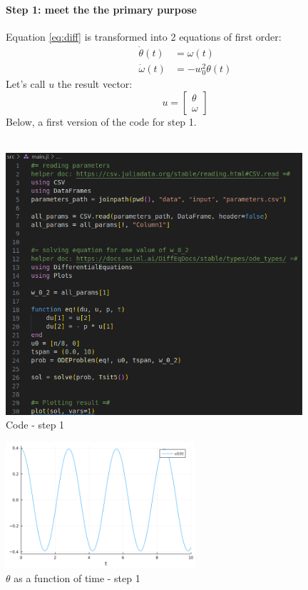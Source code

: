\documentclass[11pt]{article}
\begin{document}
				\paragraph{Step 1: meet the the primary purpose}
					Equation \ref{eq:diff} is transformed into 2 equations of first order:
					\begin{align*}
							\dot{\theta}(t) &= \omega(t) \\
							\dot{\omega}(t) &= - w_0^2 \theta(t)
					\end{align*}
					Let's call $u$ the result vector:
					\begin{equation*}
							u =
							\begin{bmatrix}
								\theta \\
								\omega
							\end{bmatrix}
					\end{equation*}
					Below, a first version of the code for step 1. \\
					\vspace{0.5cm}
					\mbox{} \\
					\begin{minipage}{0.65\textwidth}
							\centering
							\includegraphics[width=11cm]{figures/diff_equation/code_step_1.png}
							\\
							Code - step 1
					\end{minipage}
					\begin{minipage}{0.35\textwidth}
							\centering
							\includegraphics[width=7cm]{figures/diff_equation/plot_step_1.png}
							\\
							\quad $\theta$ as a function of time - step 1
					\end{minipage}
\end{document}

